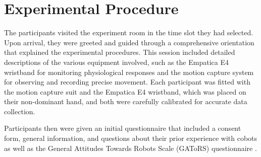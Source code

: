 \section{Experimental Procedure}
The participants visited the experiment room in the time slot they had selected. 
Upon arrival, they were greeted and guided through a comprehensive orientation that explained the experimental procedures. This session included detailed descriptions of the various equipment involved, such as the Empatica E4 wristband for monitoring physiological responses and the motion capture system for observing and recording precise movement. Each participant was fitted with the motion capture suit and the Empatica E4 wristband, which was placed on their non-dominant hand, and both were carefully calibrated for accurate data collection.

Participants then were given an initial questionnaire that included a consent form, general information, and questions about their prior experience with cobots as well as the General Attitudes Towards Robots Scale (GAToRS) questionnaire \autocite{gatrs}.

